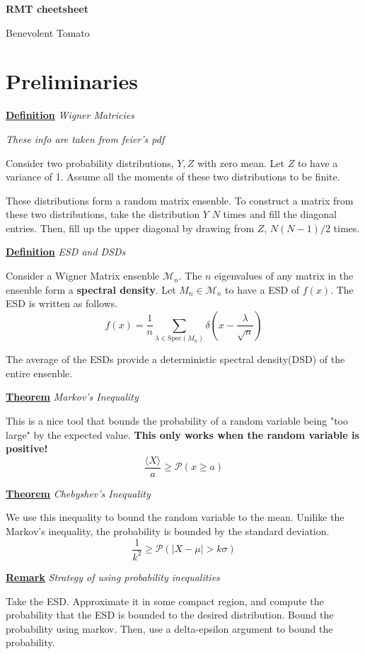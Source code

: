 \documentclass{article}
\newcommand{\new}[2]{
    \vspace{2mm}
    \noindent
    \textbf{
    \underline{#1}}
    \textit{{#2}}
    \vspace{1mm}
    \newline
}
\def\<{{\langle}}
\def\>{{\rangle}}
\begin{document}
\begin{center}
    \Large
    \textbf{RMT cheetsheet}

    \large
    Benevolent Tomato
\end{center}

\section{Preliminaries}
\new{Definition} {Wigner Matricies} 
\textit{These info are taken from feier's pdf}

Consider two probability distributions, $Y, Z$ with zero mean. 
Let $Z$ to have a variance of 1. Assume all the moments of 
these two distributions to be finite. 

These distributions form a random matrix ensenble. To construct 
a matrix from these two distributions, take the distribution $Y$ 
$N$ times and fill the diagonal entries. Then, fill up the 
upper diagonal by drawing from $Z$, $N(N-1)/2$ times. 

\new{Definition}{ESD and DSDs}
Consider a Wigner Matrix ensenble $\mathcal{M}_n$. The $n$ 
eigenvalues of any matrix in the ensenble form a \textbf{spectral density}. 
Let $M_n \in \mathcal M_n$ to have a ESD of $f(x)$. The ESD is written as follows. 
\[
    f(x) = \frac 1 n \sum_{\lambda \in \text{Spec}(M_n)} \delta(x - \frac \lambda {\sqrt n}) 
\]

The average of the ESDs provide a deterministic spectral density(DSD) of 
the entire ensenble. 

\new{Theorem}{Markov's Inequality}
This is a nice tool that bounds the probability of a random variable 
being "too large" by the expected value. \textbf{This only works when 
the random variable is positive!}
\[
    \frac{\<X\>} a \geq \mathcal{P}(x \geq a) 
\]

\new{Theorem}{Chebyshev's Inequality}
We use this inequality to bound the random variable to the mean. Unilike 
the Markov's inequality, the probability is bounded by the standard deviation. 
\[
    \frac 1 {k^2} \geq \mathcal{P}(|X - \mu| > k\sigma) 
\]

\new{Remark} {Strategy of using probability inequalities}
Take the ESD. Approximate it in some compact region, and compute the probability 
that the ESD is bounded to the desired distribution. Bound the probability using markov. 
Then, use a delta-epsilon argument to bound the probability. 

\newcommand{\Sp}{
    \text{Spec}
}
\end{document}

